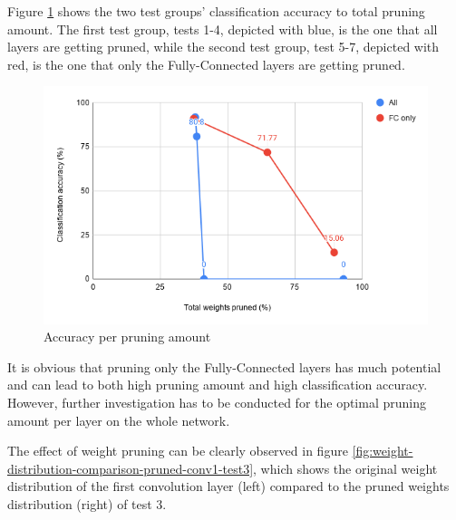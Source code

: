 Figure \ref{fig:pruning-amount-vs-accuracy} shows the two test groups' classification accuracy to total pruning amount. The first test group, tests 1-4, depicted with blue, is the one that all layers are getting pruned, while the second test group, test 5-7, depicted with red, is the one that only the Fully-Connected layers are getting pruned.

\begin{figure} [H]
	\centering
	\includegraphics[width=\textwidth]{Images/Weights-distributions/pruned/pruning-amount-vs-accuracy-chart.png}
	\decoRule
	\caption[Accuracy per pruning amount]{Accuracy per pruning amount}
	\label{fig:pruning-amount-vs-accuracy}
\end{figure}

It is obvious that pruning only the Fully-Connected layers has much potential and can lead to both high pruning amount and high classification accuracy. However, further investigation has to be conducted for the optimal pruning amount per layer on the whole network.

The effect of weight pruning can be clearly observed in figure \ref{fig:weight-distribution-comparison-pruned-conv1-test3}, which shows the original weight distribution of the first convolution layer (left) compared to the pruned weights distribution (right) of test 3.

